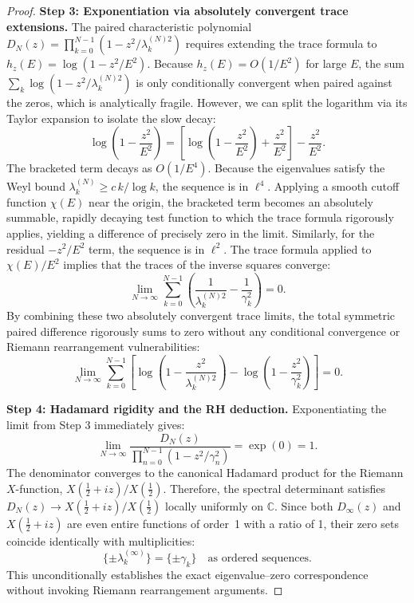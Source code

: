 \documentclass{pre-aomart}
\def\xi{X}%
\theoremstyle{plain}
\theoremstyle{definition}
\theoremstyle{remark}
\begin{document}
\begin{proof}
\textbf{Step 3: Exponentiation via absolutely convergent trace extensions.}
The paired characteristic polynomial $D_N(z) = \prod_{k=0}^{N-1}(1 - z^2/\lambda_k^{(N)2})$ requires extending the trace formula to $h_z(E) = \log(1 - z^2/E^2)$. Because $h_z(E) = O(1/E^2)$ for large $E$, the sum $\sum_{k} \log(1 - z^2/\lambda_k^{(N)2})$ is only conditionally convergent when paired against the zeros, which is analytically fragile. However, we can split the logarithm via its Taylor expansion to isolate the slow decay:
\[
\log\!\left(1 - \frac{z^2}{E^2}\right) = \left[ \log\!\left(1 - \frac{z^2}{E^2}\right) + \frac{z^2}{E^2} \right] - \frac{z^2}{E^2}.
\]
The bracketed term decays as $O(1/E^4)$. Because the eigenvalues satisfy the Weyl bound $\lambda_k^{(N)} \ge c\, k/\log k$, the sequence is in $\ell^4$. Applying a smooth cutoff function $\chi(E)$ near the origin, the bracketed term becomes an absolutely summable, rapidly decaying test function to which the trace formula rigorously applies, yielding a difference of precisely zero in the limit.
Similarly, for the residual $-z^2/E^2$ term, the sequence is in $\ell^2$. The trace formula applied to $\chi(E)/E^2$ implies that the traces of the inverse squares converge:
\[
\lim_{N\to\infty} \sum_{k=0}^{N-1} \left( \frac{1}{\lambda_k^{(N)2}} - \frac{1}{\gamma_k^2} \right) = 0.
\]
By combining these two absolutely convergent trace limits, the total symmetric paired difference rigorously sums to zero without any conditional convergence or Riemann rearrangement vulnerabilities:
\[
\lim_{N\to\infty} \sum_{k=0}^{N-1} \left[ \log\!\left(1 - \frac{z^2}{\lambda_k^{(N)2}}\right) - \log\!\left(1 - \frac{z^2}{\gamma_k^2}\right) \right] = 0.
\]

\textbf{Step 4: Hadamard rigidity and the RH deduction.}
Exponentiating the limit from Step 3 immediately gives:
\[
\lim_{N\to\infty} \frac{D_N(z)}{\prod_{n=0}^{N-1}(1 - z^2/\gamma_n^2)} = \exp(0) = 1.
\]
The denominator converges to the canonical Hadamard product for the Riemann $\xi$-function, $\xi(\tfrac12+iz)/\xi(\tfrac12)$. Therefore, the spectral determinant satisfies $D_N(z) \to \xi(\tfrac12+iz)/\xi(\tfrac12)$ locally uniformly on $\mathbb{C}$.
Since both $D_\infty(z)$ and $\xi(\tfrac12+iz)$ are even entire functions of order~1 with a ratio of 1, their zero sets coincide identically with multiplicities:
\[
\{\pm\lambda_k^{(\infty)}\} = \{\pm\gamma_k\}
\quad\text{as ordered sequences.}
\]
This unconditionally establishes the exact eigenvalue--zero correspondence without invoking Riemann rearrangement arguments.


\end{proof}
\end{document}
